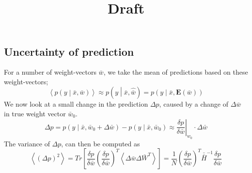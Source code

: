 \documentclass[11pt, a4paper]{article} %
\title{Draft}
\begin{document}
\maketitle


\appendix



\subsection{Uncertainty of prediction}
For a number of weight-vectors $\bar{w}$, we take the mean of predictions based on these weight-vectors;
\begin{equation}
\left\langle p \left(y \middle| \bar{x}, \bar{w} \right) \right\rangle \approx p \left(y \middle| \bar{x}, \hat{\bar{w}} \right) = p \left(y \middle| \bar{x}, \mathbf{E}(\bar{w}) \right)
\end{equation}
We now look at a small change in the prediction $\Delta p$, caused by a change of $\Delta \bar{w}$ in true weight vector $\bar{w}_0$. 
\begin{equation}
\Delta p = p \left(y \middle| \bar{x}, \bar{w}_0+\Delta \bar{w} \right)
- p \left(y \middle| \bar{x}, \bar{w}_0 \right) 
\approx \left.\frac{\delta p}{\delta \bar{w}} \right|_{w_0}\cdot \Delta \bar{w}
\end{equation}
The variance of $\Delta p$, can then be computed as
\begin{equation}
\left\langle (\Delta p)^2 \right\rangle = Tr\left[ 
\frac{\delta p}{\delta \bar{w}} \left(\frac{\delta p}{\delta \bar{w}}\right)^T
\left\langle \Delta \bar{w} \Delta \bar{W}^T \right\rangle \right]
= \frac{1}{N} \left(\frac{\delta p}{\delta \bar{w}}\right)^T 
 \bar{\bar{H}}^{-1} \frac{\delta p}{\delta \bar{w}}
\end{equation}
\end{document}
